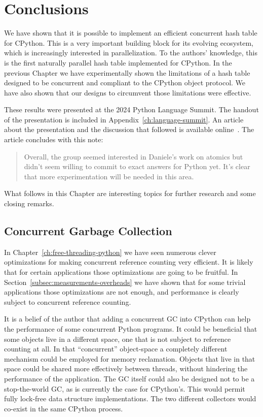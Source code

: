 \chapter{Conclusions}\label{ch:conclusions}

We have shown that it is possible to implement an efficient concurrent hash table for CPython.
This is a very important building block for its evolving ecosystem, which is increasingly interested in parallelization.
To the authors' knowledge, this is the first naturally parallel hash table implemented for CPython.
In the previous Chapter we have experimentally shown the limitations of a hash table designed to be concurrent and compliant to the CPython object protocol.
We have also shown that our designs to circumvent those limitations were effective.

These results were presented at the 2024 Python Language Summit.
The handout of the presentation is included in Appendix~\ref{ch:language-summit}.
An article about the presentation and the discussion that followed is available online~\cite{python-summit-2024-free-threading-ecosystems}.
The article concludes with this note:
\begin{quote}
    Overall, the group seemed interested in Daniele's work on atomics but didn't seem willing to commit to exact answers for Python yet.
    It's clear that more experimentation will be needed in this area.
\end{quote}

What follows in this Chapter are interesting topics for further research and some closing remarks.


\section{Concurrent Garbage Collection}\label{sec:concurrent-garbage-collection}

In Chapter~\ref{ch:free-threading-python} we have seen numerous clever optimizations for making concurrent reference counting very efficient.
It is likely that for certain applications those optimizations are going to be fruitful.
In Section~\ref{subsec:measurements-overheads} we have shown that for some trivial applications those optimizations are not enough, and performance is clearly subject to concurrent reference counting.

It is a belief of the author that adding a concurrent GC into CPython can help the performance of some concurrent Python programs.
It could be beneficial that some objects live in a different space, one that is not subject to reference counting at all.
In that ``concurrent'' object-space a completely different mechanism could be employed for memory reclamation.
Objects that live in that space could be shared more effectively between threads, without hindering the performance of the application.
The GC itself could also be designed not to be a stop-the-world GC, as is currently the case for CPython's.
This would permit fully lock-free data structure implementations.
The two different collectors would co-exist in the same CPython process.


